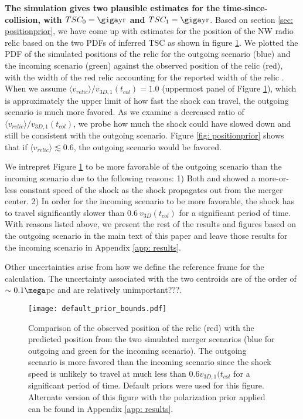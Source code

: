 \textbf{The simulation gives two plausible estimates for
the time-since-collision, with $TSC_0 = \giga \text{yr}$ and $TSC_1 = \giga
\text{yr}$}. Based on section \ref{sec: positionprior}, we have come up
with estimates for the position of the NW radio relic based on the two PDFs
of inferred TSC as shown in figure \ref{fig: positionprior}. We plotted
the PDF of the simulated positions of the relic for the outgoing scenario
(blue) and the incoming scenario (green) against
the observed position of the relic (red), with the width of the red
relic accounting for the reported width of the relic \citep{L13}. When we
assume $\langle v_{relic} \rangle / v_{3D,1}(t_{col}) = 1.0$ (uppermost
panel of Figure \ref{fig: positionprior}), which is approximately the upper
limit of how fast the shock can travel, the outgoing scenario is much more
favored. As we examine a decreased ratio of  $\langle v_{relic} \rangle /
v_{3D,1}(t_{col})$, we probe how much the shock could have slowed down
and still be consistent with the outgoing scenario. Figure \ref{fig:
positionprior} shows that if $\langle v_{relic} \rangle
\lesssim 0.6$, the outgoing scenario would be favored. \par 
	We intrepret Figure \ref{fig: positionprior} to be more favorable of
the outgoing scenario than the incoming scenario due to the following
reasons: 1) Both \citet{Springel2007} and \citet{Kang2007} showed a
more-or-less constant speed of the shock as the shock propagates out
from the merger center. 2) In order for the incoming scenario to be more
favorable, the shock has to travel significantly slower than $0.6~
v_{3D}(t_{col})$ for a significant period of time. With reasons listed
above, we present the rest of the results and figures based on the outgoing
scenario in the main text of this paper and leave those results for the
incoming scenario in Appendix \ref{app: results}. 

Other uncertainties arise from how we define the reference frame for the calculation. The
uncertainty associated with the two centroids are of the order
of $\sim 0.1 \mega$pc \citep{Jee13} and are relatively unimportant???.  

\begin{figure}
	\texttt{[image: default\_prior\_bounds.pdf]}
	\caption{Comparison of the observed position of the relic (red) with the
	predicted position from the two simulated merger scenarios (blue for
	outgoing and green for the incoming scenario). The outgoing scenario
	is more favored than the incoming scenario since the shock speed is
	unlikely to travel at much less than $0.6 v_{3D,1}(t_{col}$ for a
	significant period of time. Default priors were
	used for this figure. Alternate version of this figure with the polarization prior applied can
	be found in Appendix \ref{app: results}. \label{fig: positionprior}}
\end{figure}

